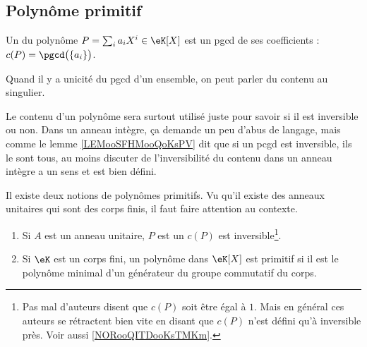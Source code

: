 \subsection{Polynôme primitif}

\begin{definition}\label{DefContenuPolynome}
	Un  du polynôme \( P=\sum_ia_iX^i\in\eK[X]\) est un pgcd de ses coefficients : \( c(P)=\pgcd\big(\{ a_i \}\big)\).
\end{definition}

\begin{normaltext}		\label{NORooQITDooKsTMKm}
	Quand il y a unicité du pgcd d'un ensemble, on peut parler du contenu au singulier.

	Le contenu d'un polynôme sera surtout utilisé juste pour savoir si il est inversible ou non. Dans un anneau intègre, ça demande un peu d'abus de langage, mais comme le lemme \ref{LEMooSFHMooQoKsPV} dit que si un pcgd est inversible, ils le sont tous, au moins discuter de l'inversibilité du contenu dans un anneau intègre a un sens et est bien défini.
\end{normaltext}

\begin{definition}           \label{DEFooDVOOooKaPZQC}
	Il existe deux notions de polynômes primitifs. Vu qu'il existe des anneaux unitaires qui sont des corps finis, il faut faire attention au contexte.
	\begin{enumerate}
		\item		\label{ITEMooCNHAooVfIYEW}
		      Si \( A\) est un anneau unitaire, \( P\) est un  \( c(P) \) est inversible\footnote{Pas mal d'auteurs disent que \( c(P)\) soit être égal à \( 1\). Mais en général ces auteurs se rétractent bien vite en disant que \( c(P)\) n'est défini qu'à inversible près. Voir aussi \ref{NORooQITDooKsTMKm}.}.
		\item
		      Si \( \eK\) est un corps fini, un polynôme dans \( \eK[X]\) est primitif si il est le polynôme minimal d'un générateur du groupe commutatif du corps.
	\end{enumerate}
\end{definition}


